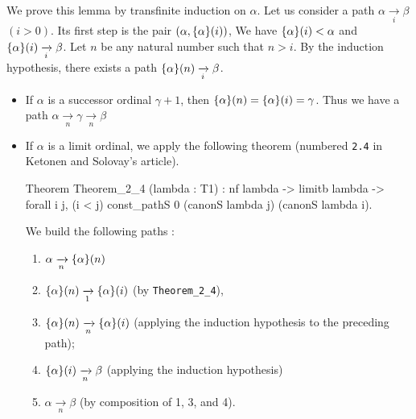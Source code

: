 We prove this lemma by transfinite induction on $\alpha$.
Let us consider a path $\alpha \xrightarrow [i]{} \beta$ $(i>0)$. Its first step is
the pair $(\alpha,\mbox{$\{\alpha\}(i)$})$, We have $\mbox{$\{\alpha\}(i)$}<\alpha$ and
$\mbox{$\{\alpha\}(i)$} \xrightarrow [i]{} \beta$. 
Let $n$ be any natural number such that $n>i$.
By the induction hypothesis, there exists a path $\mbox{$\{\alpha\}(n)$} \xrightarrow[i]{} \beta$.
\begin{itemize}
\item  If $\alpha$ is a successor ordinal $\gamma+1$, then $\mbox{$\{\alpha\}(n)$} =
\mbox{$\{\alpha\}(i)$}=\gamma$. Thus we have a path 
$\alpha  \xrightarrow [n]{}  \gamma \xrightarrow [n]{} \beta$
\item If $\alpha$ is a limit ordinal, we apply the following theorem (numbered \texttt{2.4} in Ketonen and Solovay's article). 



  \begin{Coqsrc}
Theorem Theorem_2_4 (lambda : T1) :
   nf lambda ->
   limitb lambda  ->
   forall i j, (i < j)%
               const_pathS 0 (canonS lambda j)
                             (canonS lambda i). 
  \end{Coqsrc}

 We build the following paths :

 \begin{enumerate}
 \item $\alpha \xrightarrow[n]{} \mbox{$\{\alpha\}(n)$}$
 \item $\mbox{$\{\alpha\}(n)$} \xrightarrow[1]{} \mbox{$\{\alpha\}(i)$}$ (by \texttt{Theorem\_2\_4}),
\item $\mbox{$\{\alpha\}(n)$} \xrightarrow[n]{} \mbox{$\{\alpha\}(i)$}$ (applying the induction hypothesis to the preceding path);
\item $\mbox{$\{\alpha\}(i)$} \xrightarrow[n]{} \beta$ (applying the induction hypothesis)\item $\alpha \xrightarrow[n]{} \beta$ (by composition of 1, 3, and 4).


 \end{enumerate}


\end{itemize}





